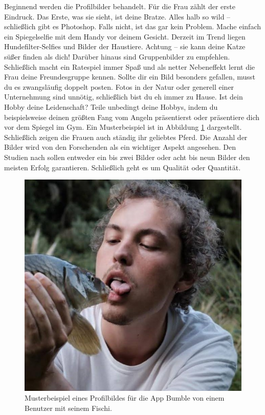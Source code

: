 Beginnend werden die Profilbilder behandelt.
Für die Frau zählt der erste Eindruck.
Das Erste, was sie sieht, ist deine Bratze.
Alles halb so wild – schließlich gibt es Photoshop.
Falls nicht, ist das gar kein Problem.
Mache einfach ein Spiegelselfie mit dem Handy vor deinem Gesicht.
Derzeit im Trend liegen Hundefilter-Selfies und Bilder der Haustiere.
Achtung – sie kann deine Katze süßer finden als dich!
Darüber hinaus sind Gruppenbilder zu empfehlen.
Schließlich macht ein Ratespiel immer Spaß und als netter Nebeneffekt lernt die Frau deine Freundesgruppe kennen.
Sollte dir ein Bild besonders gefallen, musst du es zwangsläufig doppelt posten. 
Fotos in der Natur oder generell einer Unternehmung sind unnötig, schließlich bist du eh immer zu Hause.
Ist dein Hobby deine Leidenschaft? 
Teile unbedingt deine Hobbys, indem du beispielsweise deinen größten Fang vom Angeln präsentierst oder präsentiere dich vor dem Spiegel im Gym.
Ein Musterbeispiel ist in Abbildung \ref{fig:main-fischi} dargestellt.
Schließlich zeigen die Frauen auch ständig ihr geliebtes Pferd.
Die Anzahl der Bilder wird von den Forschenden als ein wichtiger Aspekt angesehen.
Den Studien nach sollen entweder ein bis zwei Bilder oder acht bis neun Bilder den meisten Erfolg garantieren.
Schließlich geht es um Qualität oder Quantität.  

\begin{figure}[h]
    \centering
    \includegraphics[scale=0.45]{Sources/fischi.jpg}
    \caption{Musterbeispiel eines Profilbildes für die App Bumble von einem Benutzer mit seinem Fischi.}
    \label{fig:main-fischi}
\end{figure}

